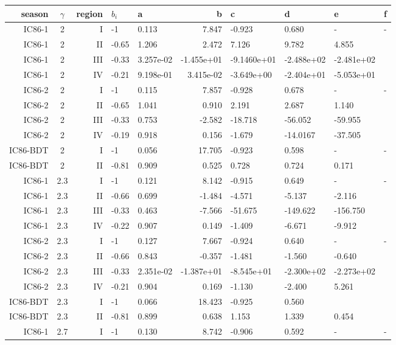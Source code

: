 \begin{table}[h]
  \centering
  \begin{tabular}{r|c|r||l|l|r|l|l|l|l}
season  &  $\gamma$ & region & $b_i$ & a & b & c 
& d & e & f \\
\hline\hline
IC86-1 & 2 & I & -1 &0.113& 7.847& -0.923 &  0.680& - & 
-\\
IC86-1 & 2 & II & -0.65 & 1.206 & 2.472 & 7.126 & 9.782 & 
4.855 \\
IC86-1 & 2 & III & -0.33 & 3.257e-02 & -1.455e+01 & -9.1460e+01 
& -2.488e+02 & -2.481e+02 \\
IC86-1 & 2 & IV & -0.21 & 9.198e-01 & 3.415e-02 & -3.649e+00 &  
-2.404e+01 & -5.053e+01 \\
\hline
IC86-2 & 2 & I &  -1 & 0.115 & 7.857 & -0.928 & 0.678 & - 
& -\\
IC86-2 & 2 & II & -0.65 & 1.041 & 0.910 & 2.191 & 2.687 & 
1.140 \\
IC86-2 & 2 & III &  -0.33 & 0.753 & -2.582 & -18.718 & 
-56.052 &  -59.955 \\
IC86-2 & 2 & IV &  -0.19 & 0.918 & 0.156 & -1.679 & 
-14.0167 & -37.505 \\
\hline
IC86-BDT & 2 & I & -1 & 0.056 & 17.705 & -0.923 & 0.598 & - & - 
\\
IC86-BDT & 2 & II & -0.81 & 0.909 & 0.525 & 0.728 & 0.724 & 0.171 \\
\hline
\hline
IC86-1 & 2.3 & I & -1 & 0.121 & 8.142 & -0.915 & 0.649 & - & -\\
IC86-1 & 2.3 & II & -0.66 & 0.699 & -1.484 & -4.571 & -5.137 & -2.116 \\
IC86-1 & 2.3 & III & -0.33 & 0.463 & -7.566 & -51.675 & -149.622 & -156.750 \\
IC86-1 & 2.3 & IV & -0.22 & 0.907 &  0.149 & -1.409 & -6.671 & -9.912 \\
\hline
IC86-2 & 2.3 & I & -1 & 0.127 & 7.667 & -0.924 &  0.640 & - & - \\
IC86-2 & 2.3 & II & -0.66 & 0.843 & -0.357 & -1.481 & -1.560 & -0.640 \\
IC86-2 & 2.3 & III & -0.33 & 2.351e-02 & -1.387e+01 & -8.545e+01 
& -2.300e+02 & -2.273e+02 \\
IC86-2 & 2.3 & IV & -0.21 & 0.904 & 0.169 & -1.130 & -2.400 & 5.261 \\
\hline
IC86-BDT & 2.3 & I & -1 & 0.066 & 18.423 & -0.925 & 0.560 \\
IC86-BDT & 2.3 & II & -0.81 & 0.899 & 0.638 & 1.153 & 1.339 & 0.454 \\
\hline
\hline
IC86-1 & 2.7 & I & -1 & 0.130 & 8.742 & -0.906 & 0.592 & - & - \\

\end{tabular}
\end{table}
